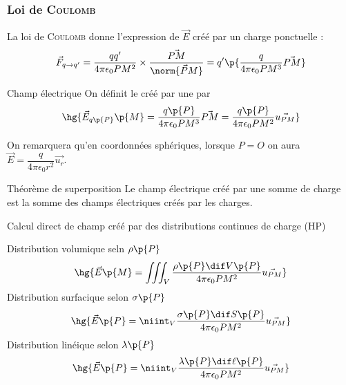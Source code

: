     \subsubsection{Loi de \textsc{Coulomb}} %
    La loi de \textsc{Coulomb} donne l'expression de $\vec E$ créé par un charge ponctuelle :
    \[ \vec F_{q\to q'} = \dfrac{qq'}{4\pi\epsilon_0 PM^2}\times\dfrac{\vec{PM}}{\norm{\vec PM}} = q'\p{\dfrac{q}{4\pi\epsilon_0PM^3}\vec{PM}}\]
    \begin{definition}{Champ électrique}{}
        On définit le  créé par une  par
        \[ \hg{ \vec E_{q\p{P}}\p{M} = \dfrac{q\p{P}}{4\pi\epsilon_0PM^3}\vec{PM} = \dfrac{q\p{P}}{4\pi\epsilon_0PM^2}\vec{u_{PM}}} \]
    \end{definition}
    
    On remarquera qu'en coordonnées sphériques, lorsque $P = O$ on aura $\vec E = \dfrac{q}{4\pi \epsilon_0 r^2}\vec{u_r}$.

    \begin{theorem}{Théorème de superposition}{}
        Le champ électrique créé par une somme de charge est la somme des champs électriques créés par les charges.
    \end{theorem}
    
    \begin{form}{Calcul direct de champ créé par des distributions continues de charge (HP)}{}
        \begin{enumerate}
            \itt Distribution volumique seln $\rho\p{P}$
            \[ \hg{\vec E \p{M} = \iiint_V \dfrac{\rho\p{P} \dif V\p{P}}{4\pi \epsilon_0 PM^2} \vec{u_{PM}}}\]
            \itt Distribution surfacique selon $\sigma\p{P}$ 
            \[ \hg{ \vec E\p{P} = \niint_V \dfrac{\sigma\p{P} \dif S\p{P}}{4\pi \epsilon_0 PM^2} \vec{u_{PM}}} \]
            \itt Distribution linéique selon $\lambda\p{P}$ 
            \[ \hg{ \vec E\p{P} = \niint_V \dfrac{\lambda\p{P} \dif \ell\p{P}}{4\pi \epsilon_0 PM^2} \vec{u_{PM}}} \]
        \end{enumerate}
    \end{form}
